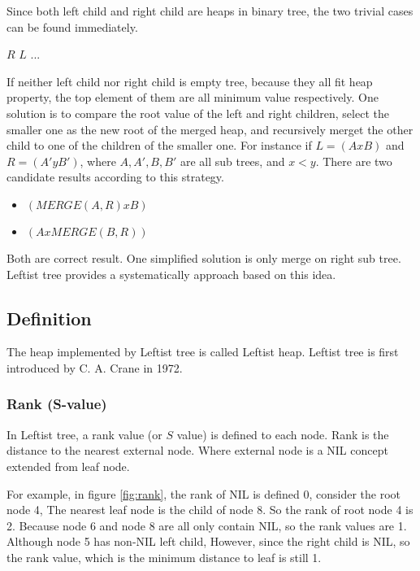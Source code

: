 \documentclass{article}
\begin{document}
Since both left child and right child are heaps in binary tree, the two trivial
cases can be found immediately.

\begin{algorithmic}[1]
    \State \Return $R$
    \State \Return $L$
  \Else
    \State $...$
  \EndIf
\EndFunction
\end{algorithmic}

If neither left child nor right child is empty tree, because they all fit
heap property, the top element of them are all minimum value respectively.
One solution is to compare the root value of the left and right children,
select the smaller one as the new root of the merged heap, and recursively
merget the other child to one of the children of the smaller one.
For instance if $L = (A x B)$ and $R = (A' y B')$, where $A, A', B, B'$
are all sub trees, and $x < y$. There are two candidate results according
to this strategy.

\begin{itemize}
\item $(MERGE(A, R) x B)$
\item $(A x MERGE(B, R))$
\end{itemize}

Both are correct result. One simplified solution is only merge on right
sub tree. Leftist tree provides a systematically approach based on this
idea.

\subsection{Definition}

The heap implemented by Leftist tree is called Leftist heap. Leftist
tree is first introduced by C. A. Crane in 1972\cite{wiki-leftist-tree}.

\subsubsection{Rank (S-value)}

In Leftist tree, a rank value (or $S$ value) is defined to each node.
Rank is the distance to the nearest external node. Where external node
is a NIL concept extended from leaf node.

For example, in figure \ref{fig:rank}, the rank of NIL
is defined 0, consider the root node 4, The nearest leaf node is
the child of node 8. So the rank of root node 4 is 2. Because node
6 and node 8 are all only contain NIL, so the rank values are 1.
Although node 5 has non-NIL left child, However, since the right
child is NIL, so the rank value, which is the minimum distance
to leaf is still 1.
\end{document}
